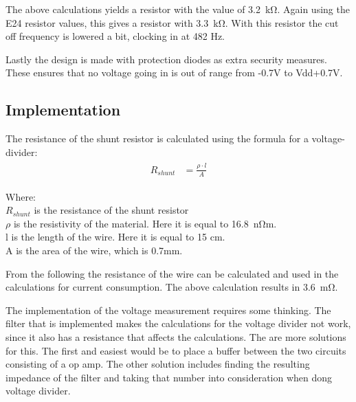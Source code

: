 The above calculations yields a resistor with the value of \SI{3.2}{\kilo \ohm}. Again using the E24 resistor values, this gives a resistor with \SI{3.3}{\kilo \ohm}. With this resistor the cut off frequency is lowered a bit, clocking in at 482 Hz.

Lastly the design is made with protection diodes as extra security measures. These ensures that no voltage going in is out of range from -0.7V to Vdd+0.7V. 

\newpage
\subsection{Implementation}
The resistance of the shunt resistor is calculated using the formula for a voltage-divider:
\begin{align}
	\begin{split}
		R_{shunt} &= \frac{\rho \cdot l}{A}
	\end{split}
\end{align}

Where:\\
$R_{shunt}$ is the resistance of the shunt resistor\\
$\rho$ is the resistivity of the material. Here it is equal to \SI{16.8}{\nano \ohm}m.\\
l is the length of the wire. Here it is equal to 15 cm.\\
A is the area of the wire, which is 0.7mm.

From the following the resistance of the wire can be calculated and used in the calculations for current consumption. The above calculation results in \SI{3.6}{\milli \ohm}.

The implementation of the voltage measurement requires some thinking. The filter that is implemented makes the calculations for the voltage divider not work, since it also has a resistance that affects the calculations. The are more solutions for this. The first and easiest would be to place a buffer between the two circuits consisting of a op amp. The other solution includes finding the resulting impedance of the filter and taking that number into consideration when dong voltage divider. 